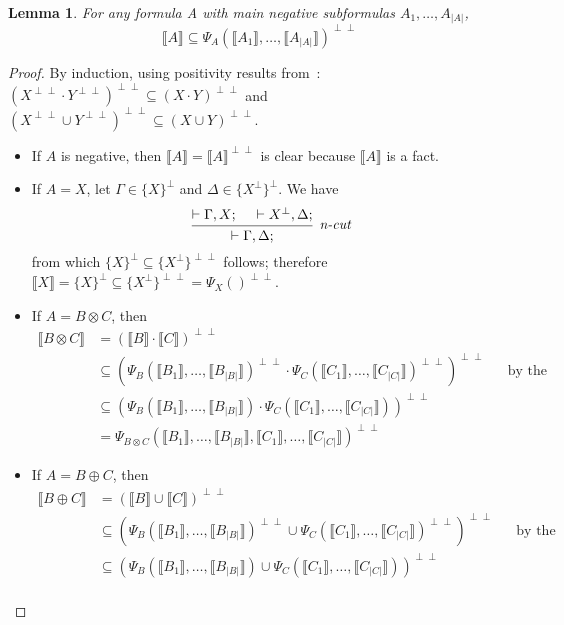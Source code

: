 \documentclass[11pt]{article}
\newtheorem{lemma}[theorem]{Lemma}
\newcommand\size[1]{{\lvert #1 \rvert}}
\newcommand\sem[1]{{\llbracket #1 \rrbracket}}
\newcommand\biperp{{\perp\perp}}
\begin{document}
\begin{lemma}
    \label{positivity}
    For any formula A with main negative subformulas $A_1, \dots, A_\size{A}$, $$\sem{A} \subseteq \Psi_A(\sem{A_1}, \dots, \sem{A_\size{A}})^\biperp$$
\end{lemma}
\begin{proof}
    By induction, using positivity results from~\cite[appendix F]{girard}: $(X^\biperp \cdot Y^\biperp)^\biperp \subseteq (X \cdot Y)^\biperp$ and $(X^\biperp \cup Y^\biperp)^\biperp \subseteq (X \cup Y)^\biperp$.
    \begin{itemize}
        \item If $A$ is negative, then $\sem{A} = \sem{A}^\biperp$ is clear because $\sem{A}$ is a fact.
        \item If $A = X$, let $\Gamma \in \{X\}^\perp$ and $\Delta \in \{X^\perp\}^\perp$. We have
        $$\begin{prooftree}
            \hypo{\vdash \Gamma, X;}
            \hypo{\vdash X^\perp, \Delta;}
            \infer2[\textit{n-cut}]{\vdash \Gamma, \Delta;}
        \end{prooftree}$$
        from which $\{X\}^\perp \subseteq \{X^\perp\}^\biperp$ follows; therefore $\sem{X} = \{X\}^\perp \subseteq \{X^\perp\}^\biperp = \Psi_X()^\biperp$.
        \item If $A = B \otimes C$, then \begin{align*}
            \sem{B \otimes C} &= (\sem{B} \cdot \sem{C})^\biperp \\
            &\subseteq (\Psi_B(\sem{B_1}, \dots, \sem{B_\size{B}})^\biperp \cdot \Psi_C(\sem{C_1}, \dots, \sem{C_\size{C}})^\biperp)^\biperp &&\text{by the induction hypothesis}\\
            &\subseteq (\Psi_B(\sem{B_1}, \dots, \sem{B_\size{B}}) \cdot \Psi_C(\sem{C_1}, \dots, \sem{C_\size{C}}))^\biperp \\
            &= \Psi_{B \otimes C}(\sem{B_1}, \dots, \sem{B_\size{B}}, \sem{C_1}, \dots, \sem{C_\size{C}})^\biperp
        \end{align*}
        \item If $A = B \oplus C$, then \begin{align*}
            \sem{B \oplus C} &= (\sem{B} \cup \sem{C})^\biperp \\
            &\subseteq (\Psi_B(\sem{B_1}, \dots, \sem{B_\size{B}})^\biperp \cup \Psi_C(\sem{C_1}, \dots, \sem{C_\size{C}})^\biperp)^\biperp &&\text{by the induction hypothesis}\\
            &\subseteq (\Psi_B(\sem{B_1}, \dots, \sem{B_\size{B}}) \cup \Psi_C(\sem{C_1}, \dots, \sem{C_\size{C}}))^\biperp \\

\end{align*}
\end{itemize}
\end{proof}
\end{document}
